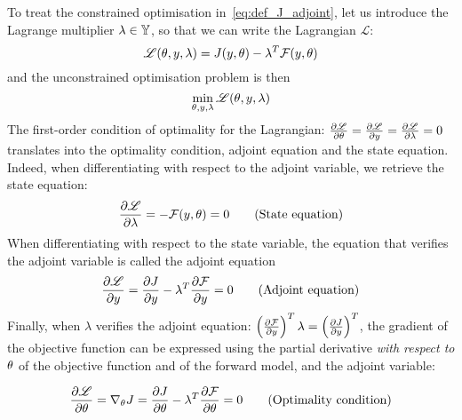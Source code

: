 \documentclass[../../Main_ManuscritThese.tex]{subfiles}
\begin{document}
To treat the constrained optimisation in~\cref{eq:def_J_adjoint}, let
us introduce the Lagrange multiplier $\lambda \in \mathbb{Y}$, so that we
can write the Lagrangian $\mathscr{L}$:
\begin{equation}
  \mathscr{L}(\theta, y, \lambda) = J(y,\theta) - \lambda^T \mathcal{F}(y, \theta)
\end{equation}
and the unconstrained optimisation problem is then
\begin{equation}
  \min_{\theta,y,\lambda} \mathscr{L}(\theta,y,\lambda)
\end{equation}
The first-order condition of optimality for the Lagrangian:
$\frac{\partial \mathscr{L}}{\partial \theta} = \frac{\partial \mathscr{L}}{\partial y} =
\frac{\partial \mathscr{L}}{\partial \lambda} = 0$ translates into the optimality
condition, adjoint equation and the state equation. Indeed, when
differentiating with respect to the adjoint variable, we retrieve the
state equation:
\begin{equation}
  \frac{\partial \mathscr{L}}{\partial \lambda} = - \mathcal{F}(y,\theta) = 0 \tag{State equation}
\end{equation}
When differentiating with respect to the state variable, the equation that verifies the adjoint variable is called the adjoint equation
\begin{equation}
  \frac{\partial \mathscr{L}}{\partial y} = \frac{\partial J}{\partial y} - \lambda^T \frac{\partial \mathcal{F}}{\partial y}= 0  \tag{Adjoint equation}
\end{equation}
Finally, when $\lambda$ verifies the adjoint equation:
$ \left(\frac{\partial \mathcal{F}}{\partial y}\right)^T\lambda=
\left(\frac{\partial J}{\partial y}\right)^T$, the gradient of the objective function
can be expressed using the partial derivative \emph{with respect to
  $\theta$} of the objective function and of the forward model, and the
adjoint variable:

\begin{equation}
    \pfrac{\mathscr{L}}{\kk} = \nabla_\kk J %
                               = \pfrac{J}{\kk} - \innerprod{\lambda}{\pfrac{\mathcal{F}}{\kk}} = 0 \tag{Optimality condition}
\end{equation}
\end{document}
